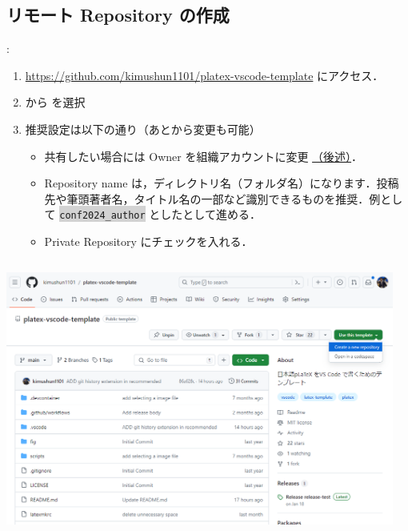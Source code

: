 \documentclass[aspectratio=169,dvipdfmx,cjk]{beamer}
\newcommand{\cmdline}[1]{
    \colorbox{lightgray}{\lstinline[style=command]{#1}}
}
\begin{document}
\subsection{リモート Repository の作成}
\begin{frame}[label=create-repo]{\insertsection \thesubsection: \insertsubsection}
  \begin{enumerate}
    \item \href{https://github.com/kimushun1101/platex-vscode-template}{https://github.com/kimushun1101/platex-vscode-template} にアクセス．
    \item {} から  を選択
    \item 推奨設定は以下の通り（あとから変更も可能）
    \begin{itemize}
      \item 共有したい場合には Owner を組織アカウントに変更 \hyperlink{organization}{（後述）}．
      \item Repository name は，ディレクトリ名（フォルダ名）になります．投稿先や筆頭著者名，タイトル名の一部など識別できるものを推奨．例として \cmdline{conf2024_author} としたとして進める．
      \item Private Repository にチェックを入れる．
    \end{itemize}
  \end{enumerate}
  \begin{columns}
    \begin{column}{0.4\textwidth}
        \includegraphics[width=1.0\linewidth]{fig/platex-vecode-temp.png}
    \end{column}
    \begin{column}{0.28\textwidth}

\end{column}
\end{columns}
\end{frame}
\end{document}
